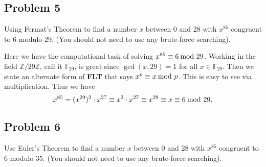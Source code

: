 \documentclass[../hw_sols.tex]{subfiles}
\begin{document}

\subsection*{Problem 5}

Using Fermat's Theorem to find a number $x$ between 0 and 28 with $x^{85}$ 
congruent to 6 modulo 29. (You should not need to use any brute-force 
searching).

\begin{solution}
Here we have the computational task of solving $x^{85} \equiv 6 \tmod{29}$. 
Working in the field $\mathbb{Z}/29\mathbb{Z}$, call it $\mathbb{F}_{29}$, is 
great since $\gcd(x,29) = 1$ for all $x \in \mathbb{F}_{29}$. Then we state an 
alternate form of \textbf{FLT} that says $x^p \equiv x \tmod{p}$. This is easy 
to see via multiplication. Thus we have
	$$x^{85} = (x^{29})^2 \cdot x^{27} \equiv x^2 \cdot x^{27} 
	\equiv x^{29} \equiv x \equiv 6 \tmod{29}.$$
\end{solution}


\newpage



\subsection*{Problem 6}

Use Euler's Theorem to find a number $x$ between 0 and 28 with $x^{85}$ 
congruent to 6 modulo 35. (You should not need to use any brute-force 
searching).
\end{document}
